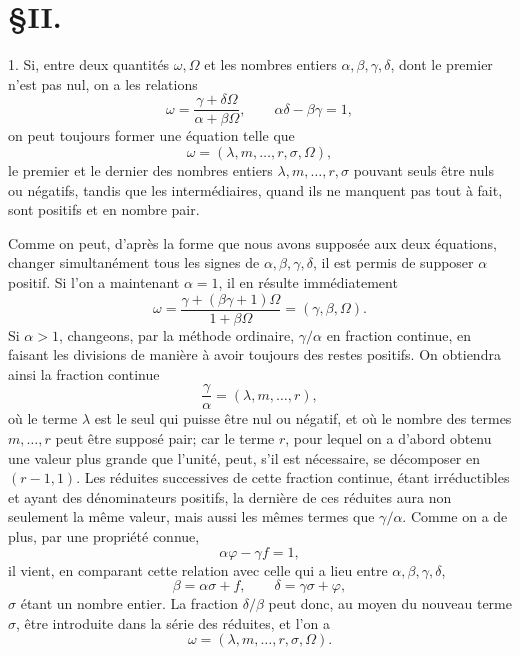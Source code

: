 \documentclass[11pt]{article}
\begin{document}
\section*{\S II.}

1. Si, entre deux quantités $\omega,\Omega$ et les nombres entiers $\alpha,\beta,\gamma,\delta$, dont le premier n'est pas nul, on a les relations
\[
 \omega=\frac{\gamma+\delta\Omega}{\alpha+\beta\Omega},\qquad
 \alpha\delta-\beta\gamma=1,
\]
on peut toujours former une équation telle que
\[
  \omega=(\lambda,m,\ldots,r,\sigma,\Omega),
\]
le premier et le dernier des nombres entiers $\lambda,m,\ldots,r,\sigma$ pouvant seuls être nuls ou négatifs, tandis que les intermédiaires, quand ils ne manquent pas tout à fait, sont positifs et en nombre pair.

Comme on peut, d'après la forme que nous avons supposée aux deux équations, changer simultanément tous les signes de $\alpha,\beta,\gamma,\delta$, il est permis de supposer $\alpha$ positif. Si l'on a maintenant $\alpha=1$, il en résulte immédiatement
\[
 \omega=\frac{\gamma+(\beta\gamma+1)\Omega}{1+\beta\Omega}
       =(\gamma,\beta,\Omega).
\]
Si $\alpha>1$, changeons, par la méthode ordinaire, $\gamma/\alpha$ en fraction continue, en faisant les divisions de manière à avoir toujours des restes positifs. On obtiendra ainsi la fraction continue
\[
  \frac{\gamma}{\alpha}=(\lambda,m,\ldots,r),
\]
où le terme $\lambda$ est le seul qui puisse être nul ou négatif, et où le nombre des termes $m,\ldots,r$ peut être supposé pair; car le terme $r$, pour lequel on a d'abord obtenu une valeur plus grande que l'unité, peut, s'il est nécessaire, se décomposer en $(r-1,1)$. Les réduites successives de cette fraction continue, étant irréductibles et ayant des dénominateurs positifs, la dernière de ces réduites aura non seulement la même valeur, mais aussi les mêmes termes que $\gamma/\alpha$. Comme on a de plus, par une propriété connue,
\[
  \alpha\varphi-\gamma f=1,
\]
il vient, en comparant cette relation avec celle qui a lieu entre $\alpha,\beta,\gamma,\delta$,
\[
  \beta=\alpha\sigma+f,\qquad \delta=\gamma\sigma+\varphi,
\]
$\sigma$ étant un nombre entier. La fraction $\delta/\beta$ peut donc, au moyen du nouveau terme $\sigma$, être introduite dans la série des réduites, et l'on a
\[
  \omega=(\lambda,m,\ldots,r,\sigma,\Omega).
\]
\end{document}
